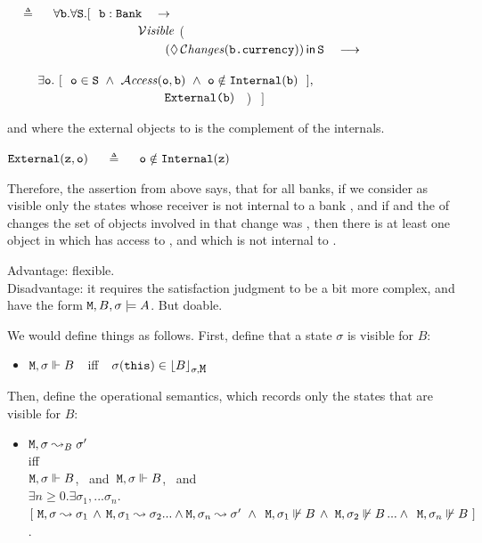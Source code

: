 \documentclass[acmsmall,screen]{acmart}
\begin{document}
  \ \  $\triangleq$ \ \
  $\forall {\mbox{\tt{b}}}.\forall {\mbox{\tt{S}}}.
  [ \ \ {\mbox{\tt{b}}}:
  {\mbox{\tt{Bank}}} \ \ \ \rightarrow $\\
$ \strut \hspace{1.4in} \ \mathcal{V}\textrm{\textit{isible}}$ (   \\
$ \strut \hspace{1.7in}\ \Using{(\Future\Changes{\prg{b.currency}})}{\prg{S}} \ \ \ \longrightarrow \ \  $\\
 \strut $~ $ \ \ \ \hspace{2.0in}   
 $\exists \prg{o}. \ [ \ \
  \prg{o}\in \prg{S}\   \wedge\  \CanAccess{\prg{o}}{\prg{b}}\ \wedge\     \prg{o}\notin\prg{Internal}(\prg{b})  
\ \ ],$ \\
  $ \strut \hspace{1.7in} \ \prg{External(b})$ \ ) $ \ \ ]$

\noindent 
and where the external objects to  is the complement of the internals.

 \noindent
${\mbox{\tt{External}}}({\mbox{\tt{z}}},{\mbox{\tt{o}}})$ \ \  $\triangleq$ \ \   $ {\mbox{\tt{o}}} \notin {\mbox{\tt{Internal}}}({\mbox{\tt{z}}})$

Therefore, the assertion from above says, that for all banks, if we consider as visible only the states whose receiver is not internal to a bank , and if and the   of  changes
the set of objects involved in that change was , then there is at least one object in  which has access to , and which is not internal to .

\vspace{.3in}
\noindent
Advantage:  flexible.
\\
Disadvantage:  it requires the satisfaction judgment to be a bit more complex, and have the form 
${\mbox{\tt{M}}}, B, \sigma \models A$. But doable.

\noindent
We would define things as follows. First, define that a state $\sigma$ is visible for $B$:

\begin{itemize}
\item
${\mbox{\tt{M}}}, \sigma \Vdash B$\ \ iff\ \ $ \sigma({{{\mbox{\tt{this}}}}})\in {\ensuremath{\lfloor{ {B}}\rfloor_{\sigma,{\mbox{\tt{M}}}}}}$
\end{itemize}

Then, define the operational semantics, which records only the states that are visible for $B$:

\begin{itemize}
\item
${\mbox{\tt{M}}} , \sigma \leadsto_B \sigma'$ \\  iff\\
  ${\mbox{\tt{M}}}, \sigma \Vdash B$, \ and\  ${\mbox{\tt{M}}}, \sigma \Vdash B$, \ and \\
    $\exists n\geq 0. \exists \sigma_1, ... \sigma_n.$\\  
    $[ \ {\mbox{\tt{M}}}, \sigma \leadsto \sigma_1\, \wedge\,  {\mbox{\tt{M}}}, \sigma_1 \leadsto \sigma_2  ... \wedge  {\mbox{\tt{M}}}, \sigma_n \leadsto \sigma' \ \wedge\ \,
      {\mbox{\tt{M}}}, \sigma_1 \not\Vdash B\, \wedge\ {\mbox{\tt{M}}}, \sigma_2 \not\Vdash B\,  ... \wedge\,  \ {\mbox{\tt{M}}}, \sigma_n \not\Vdash B\ ]$.
\end{itemize}
\end{document}
